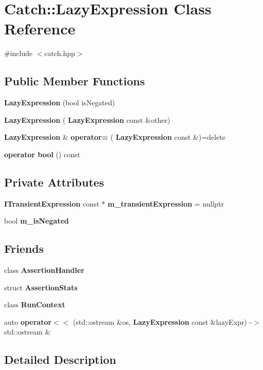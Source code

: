\section{Catch\+::Lazy\+Expression Class Reference}
\label{class_catch_1_1_lazy_expression}


{\ttfamily \#include $<$catch.\+hpp$>$}

\subsection*{Public Member Functions}
\begin{DoxyCompactItemize}
\item 
\textbf{ Lazy\+Expression} (bool is\+Negated)
\item 
\textbf{ Lazy\+Expression} (\textbf{ Lazy\+Expression} const \&other)
\item 
\textbf{ Lazy\+Expression} \& \textbf{ operator=} (\textbf{ Lazy\+Expression} const \&)=delete
\item 
\textbf{ operator bool} () const
\end{DoxyCompactItemize}
\subsection*{Private Attributes}
\begin{DoxyCompactItemize}
\item 
\textbf{ I\+Transient\+Expression} const  $\ast$ \textbf{ m\+\_\+transient\+Expression} = nullptr
\item 
bool \textbf{ m\+\_\+is\+Negated}
\end{DoxyCompactItemize}
\subsection*{Friends}
\begin{DoxyCompactItemize}
\item 
class \textbf{ Assertion\+Handler}
\item 
struct \textbf{ Assertion\+Stats}
\item 
class \textbf{ Run\+Context}
\item 
auto \textbf{ operator$<$$<$} (std\+::ostream \&os, \textbf{ Lazy\+Expression} const \&lazy\+Expr) -\/$>$ std\+::ostream \&
\end{DoxyCompactItemize}


\subsection{Detailed Description}



